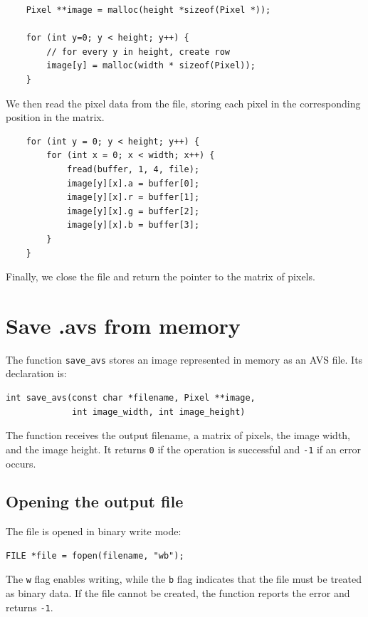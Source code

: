 \documentclass{article}
\begin{document}
\begin{lstlisting}
    Pixel **image = malloc(height *sizeof(Pixel *));

    for (int y=0; y < height; y++) {
        // for every y in height, create row
        image[y] = malloc(width * sizeof(Pixel));
    }
\end{lstlisting}

We then read the pixel data from the file, storing each pixel in the corresponding position in the matrix.

\begin{lstlisting}
    for (int y = 0; y < height; y++) {
        for (int x = 0; x < width; x++) {
            fread(buffer, 1, 4, file);
            image[y][x].a = buffer[0];
            image[y][x].r = buffer[1];
            image[y][x].g = buffer[2];
            image[y][x].b = buffer[3];
        }
    }
\end{lstlisting}


Finally, we close the file and return the pointer to the matrix of pixels.


\section{Save .avs from memory}

The function \texttt{save\_avs} stores an image represented in memory as an AVS
file. Its declaration is:

\begin{lstlisting}
int save_avs(const char *filename, Pixel **image,
             int image_width, int image_height)
\end{lstlisting}

The function receives the output filename, a matrix of pixels, the image width,
and the image height. It returns \texttt{0} if the operation is successful and
\texttt{-1} if an error occurs.

\subsection{Opening the output file}

The file is opened in binary write mode:

\begin{lstlisting}
FILE *file = fopen(filename, "wb");
\end{lstlisting}

The \texttt{w} flag enables writing, while the \texttt{b} flag indicates that
the file must be treated as binary data. If the file cannot be created, the
function reports the error and returns \texttt{-1}.
\end{document}
